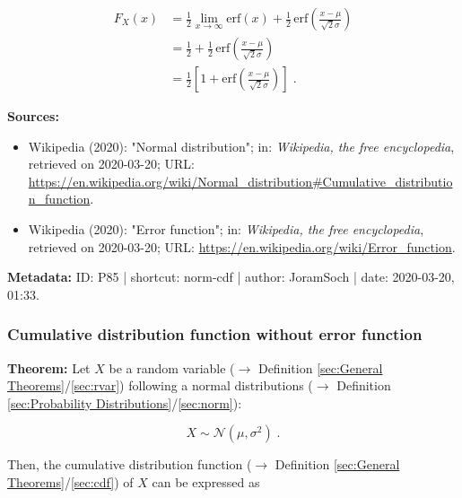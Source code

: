 \documentclass[a4paper,12pt,twoside]{book}
\begin{document}
\begin{equation} \label{eq:norm-cdf-norm-cdf-s3}
\begin{split}
F_X(x) &= \frac{1}{2} \lim_{x \to \infty} \mathrm{erf}(x) + \frac{1}{2} \, \mathrm{erf}\left( \frac{x-\mu}{\sqrt{2} \sigma} \right) \\
&= \frac{1}{2} + \frac{1}{2} \, \mathrm{erf}\left( \frac{x-\mu}{\sqrt{2} \sigma} \right) \\
&= \frac{1}{2} \left[ 1 + \mathrm{erf}\left( \frac{x-\mu}{\sqrt{2} \sigma} \right) \right] \; .
\end{split}
\end{equation}


\vspace{1em}
\textbf{Sources:}
\begin{itemize}
\item Wikipedia (2020): "Normal distribution"; in: \textit{Wikipedia, the free encyclopedia}, retrieved on 2020-03-20; URL: \url{https://en.wikipedia.org/wiki/Normal_distribution#Cumulative_distribution_function}.
\item Wikipedia (2020): "Error function"; in: \textit{Wikipedia, the free encyclopedia}, retrieved on 2020-03-20; URL: \url{https://en.wikipedia.org/wiki/Error_function}.
\end{itemize}


\vspace{1em}
\textbf{Metadata:} ID: P85 | shortcut: norm-cdf | author: JoramSoch | date: 2020-03-20, 01:33.
\vspace{1em}



\subsubsection[\textbf{Cumulative distribution function without error function}]{Cumulative distribution function without error function} \label{sec:norm-cdfwerf}
\setcounter{equation}{0}

\textbf{Theorem:} Let $X$ be a random variable ($\rightarrow$ Definition \ref{sec:General Theorems}/\ref{sec:rvar}) following a normal distributions ($\rightarrow$ Definition \ref{sec:Probability Distributions}/\ref{sec:norm}):

\begin{equation} \label{eq:norm-cdfwerf-norm}
X \sim \mathcal{N}(\mu, \sigma^2) \; .
\end{equation}

Then, the cumulative distribution function ($\rightarrow$ Definition \ref{sec:General Theorems}/\ref{sec:cdf}) of $X$ can be expressed as
\end{document}
